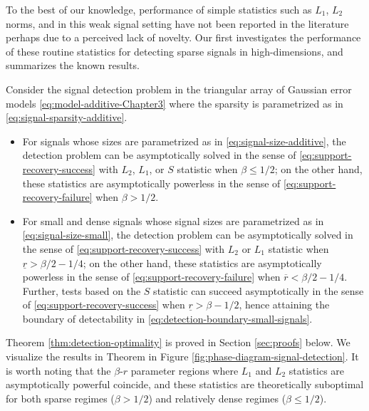 To the best of our knowledge, performance of simple statistics such as $L_1$, $L_2$ norms, and 
in this weak signal setting have not been reported in the literature perhaps due to a perceived lack of novelty.
Our first  investigates the performance of these routine statistics for detecting sparse signals in high-dimensions, and summarizes the known results.

\begin{theorem} \label{thm:detection-optimality}
Consider the signal detection problem in the triangular array of Gaussian error models \eqref{eq:model-additive-Chapter3} where the sparsity is parametrized as in \eqref{eq:signal-sparsity-additive}.
\begin{itemize}
    \item For signals whose sizes are parametrized as in \eqref{eq:signal-size-additive}, the detection problem can be asymptotically solved in the sense of \eqref{eq:support-recovery-success} with $L_2$, $L_1$, or $S$ statistic when $\beta\le 1/2$; on the other hand, these statistics are asymptotically powerless in the sense of \eqref{eq:support-recovery-failure} when $\beta>1/2$.
    \item For small and dense signals whose signal sizes are parametrized as in \eqref{eq:signal-size-small}, the detection problem can be asymptotically solved in the sense of \eqref{eq:support-recovery-success} with $L_2$ or $L_1$ statistic when $\underline{r}>\beta/2-{1}/{4}$; on the other hand, these statistics are asymptotically powerless in the sense of \eqref{eq:support-recovery-failure} when $\overline{r}<\beta/2-{1}/{4}$.
    Further, tests based on the $S$ statistic can succeed asymptotically in the sense of \eqref{eq:support-recovery-success} when $\underline{r}>\beta-1/2$, hence attaining the boundary of detectability in \eqref{eq:detection-boundary-small-signals}.
\end{itemize}
\end{theorem}

Theorem \ref{thm:detection-optimality} is proved in Section \ref{sec:proofs} below.
We visualize the results in Theorem in Figure \ref{fig:phase-diagram-signal-detection}.
It is worth noting that the $\beta$-$r$ parameter regions where $L_1$ and $L_2$ statistics are asymptotically powerful coincide, and these statistics are theoretically suboptimal for both sparse regimes ($\beta>1/2$) and relatively dense regimes ($\beta\le 1/2$).

